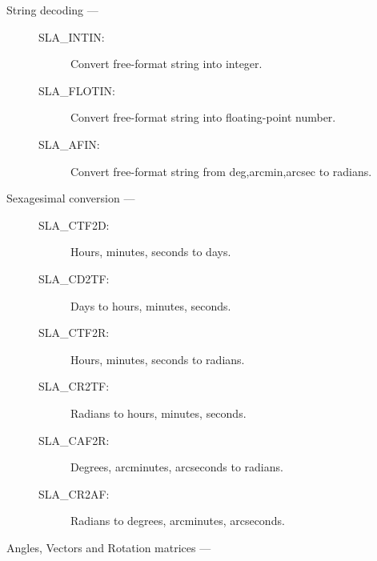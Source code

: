 \begin{description}

\item [String decoding ---]

\begin{description}
\item [SLA\_INTIN:]  Convert free-format string into integer.
\item [SLA\_FLOTIN:]  Convert free-format string into floating-point number.
\item [SLA\_AFIN:]  Convert free-format string from deg,arcmin,arcsec to radians.
\end{description}

\item [Sexagesimal conversion ---]

\begin{description}
\item [SLA\_CTF2D:]  Hours, minutes, seconds to days.
\item [SLA\_CD2TF:]  Days to hours, minutes, seconds.
\item [SLA\_CTF2R:]  Hours, minutes, seconds to radians.
\item [SLA\_CR2TF:]  Radians to hours, minutes, seconds.
\item [SLA\_CAF2R:]  Degrees, arcminutes, arcseconds to radians.
\item [SLA\_CR2AF:]  Radians to degrees, arcminutes, arcseconds.
\end{description}

\item [Angles, Vectors and Rotation matrices ---]


\end{description}

